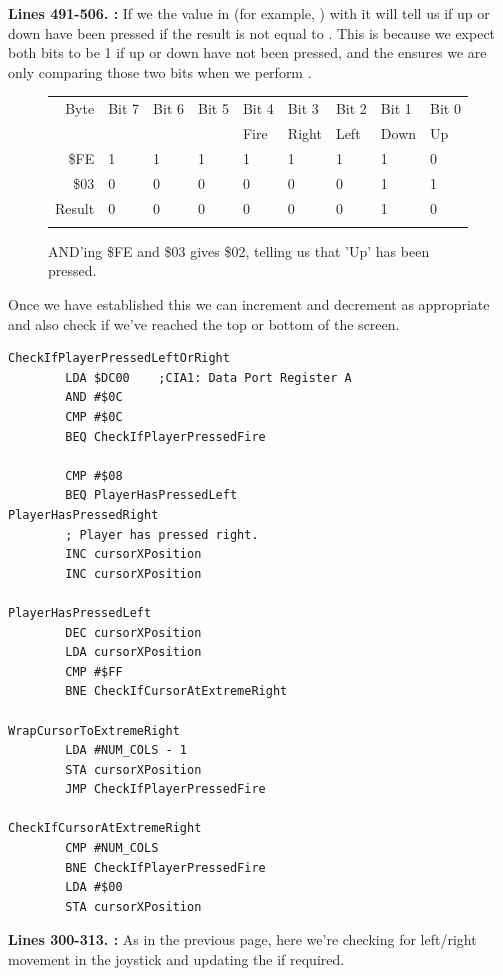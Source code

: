 \textbf{Lines 491-506. :} If we  the value in  (for
example, ) with
 it will tell us if up or down have been pressed if the result is not equal to . This is because
we expect both bits to be 1 if up or down have not been pressed, and the  ensures we are only comparing those
two bits when we perform .
\begin{figure}[H]
  {
    \setlength{\tabcolsep}{3.0pt}
    \setlength\cmidrulewidth{\heavyrulewidth} %
    \begin{adjustbox}{width=5cm,center}

      \begin{tabular}{rllllllll}
        \toprule
        Byte & Bit 7 & Bit 6 & Bit 5 & Bit 4 & Bit 3 & Bit 2 & Bit 1 & Bit 0        \\
             &       &       &       & Fire  & Right & Left  & Down  & Up           \\
        \midrule
        \$FE & 1 & 1 & 1 & 1 & 1 & 1 & 1 & 0 \\
        \$03 & 0 & 0 & 0 & 0 & 0 & 0 & 1 & 1 \\
        \midrule
        Result & 0 & 0 & 0 & 0 & 0 & 0 & 1 & 0 \\
        \addlinespace
        \bottomrule
      \end{tabular}
    \end{adjustbox}
    }\caption*{AND'ing \$FE and \$03 gives \$02, telling us that 'Up' has been pressed.}
\end{figure}

Once we have established this we can increment and decrement  as appropriate and also check
if we've reached the top or bottom of the screen. 
\clearpage
\begin{lstlisting}
CheckIfPlayerPressedLeftOrRight   
        LDA $DC00    ;CIA1: Data Port Register A
        AND #$0C
        CMP #$0C
        BEQ CheckIfPlayerPressedFire

        CMP #$08
        BEQ PlayerHasPressedLeft
PlayerHasPressedRight
        ; Player has pressed right.
        INC cursorXPosition
        INC cursorXPosition

PlayerHasPressedLeft   
        DEC cursorXPosition
        LDA cursorXPosition
        CMP #$FF
        BNE CheckIfCursorAtExtremeRight

WrapCursorToExtremeRight
        LDA #NUM_COLS - 1
        STA cursorXPosition
        JMP CheckIfPlayerPressedFire

CheckIfCursorAtExtremeRight   
        CMP #NUM_COLS
        BNE CheckIfPlayerPressedFire
        LDA #$00
        STA cursorXPosition

\end{lstlisting}
\clearpage
\textbf{Lines 300-313. :} As in the previous page, here we're checking for left/right
movement in the joystick and updating the  if required.

